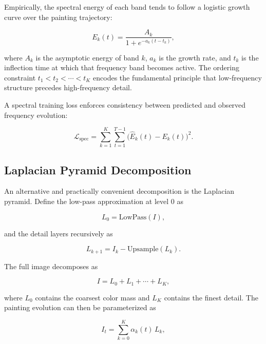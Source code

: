 \documentclass[12pt,a4paper]{article}
\theoremstyle{draftthm}
\begin{document}
Empirically, the spectral energy of each band tends to follow a logistic growth curve over the painting trajectory:

\begin{equation}
  E_k(t) = \frac{A_k}{1 + e^{-a_k(t - t_k)}},
  \label{eq:logistic-growth}
\end{equation}

where $A_k$ is the asymptotic energy of band $k$, $a_k$ is the growth rate, and $t_k$ is the inflection time at which that frequency band becomes active. The ordering constraint $t_1 < t_2 < \cdots < t_K$ encodes the fundamental principle that low-frequency structure precedes high-frequency detail.

A spectral training loss enforces consistency between predicted and observed frequency evolution:

\begin{equation}
  \mathcal{L}_{\mathrm{spec}}
  =
  \sum_{k=1}^{K}
  \sum_{t=1}^{T-1}
  \bigl(\hat{E}_k(t) - E_k(t)\bigr)^2.
  \label{eq:spectral-loss}
\end{equation}

\subsection{Laplacian Pyramid Decomposition}

An alternative and practically convenient decomposition is the Laplacian pyramid. Define the low-pass approximation at level $0$ as

\begin{equation}
  L_0 = \mathrm{LowPass}(I),
\end{equation}

and the detail layers recursively as

\begin{equation}
  L_{k+1} = I_k - \mathrm{Upsample}(L_k).
\end{equation}

The full image decomposes as

\begin{equation}
  I = L_0 + L_1 + \cdots + L_K,
\end{equation}

where $L_0$ contains the coarsest color mass and $L_K$ contains the finest detail. The painting evolution can then be parameterized as

\begin{equation}
  I_t = \sum_{k=0}^{K} \alpha_k(t)\, L_k,
  \label{eq:pyramid-decomp}
\end{equation}
\end{document}
